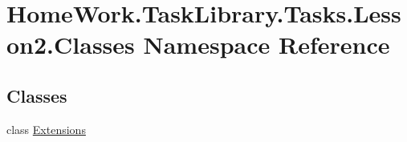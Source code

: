 \hypertarget{namespace_home_work_1_1_task_library_1_1_tasks_1_1_lesson2_1_1_classes}{}\section{Home\+Work.\+Task\+Library.\+Tasks.\+Lesson2.\+Classes Namespace Reference}
\label{namespace_home_work_1_1_task_library_1_1_tasks_1_1_lesson2_1_1_classes}
\subsection*{Classes}
\begin{DoxyCompactItemize}
\item 
class \mbox{\hyperlink{class_home_work_1_1_task_library_1_1_tasks_1_1_lesson2_1_1_classes_1_1_extensions}{Extensions}}
\end{DoxyCompactItemize}
